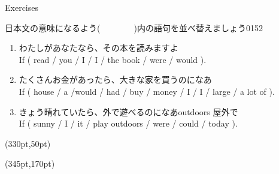 \documentclass[aspectratio=169,xcolor={dvipsnames,table}]{beamer}
\begin{document}
\begin{frame}[plain,t]{Exercises}

{\small 日本文の意味になるよう(~~~~~~~~)内の語句を並べ替えましょう}\hfill{\tiny 0152}\,{\scriptsize {}} 
 \begin{enumerate}
  \item わたしがあなたなら、その本を読みますよ\\
If ( read / you / I / I / the book / were / would  ).\\
  \item たくさんお金があったら、大きな家を買うのになあ\\
If ( house / a /would / had / buy / money / I / I / large / a lot of ).\\
  \item きょう晴れていたら、外で遊べるのになあ\hfill{\scriptsize outdoors  屋外で}\\
If ( sunny / I / it / play outdoors / were / could / today ).\\
 \end{enumerate}

\begin{textblock*}{0.4\linewidth}(330pt,50pt)
\end{textblock*}

\begin{textblock*}{0.65\linewidth}(345pt,170pt)
\end{textblock*}
\end{frame}
\end{document}
